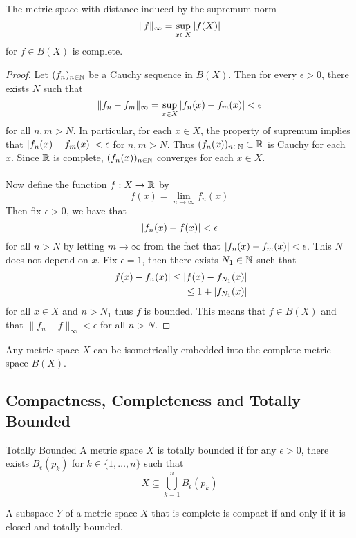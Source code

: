 \documentclass[a4paper]{article}
\begin{document}
\begin{prp}{}{} The metric space with distance induced by the supremum norm $$\|f\|_{\infty}=\sup_{x\in X}\abs{f(X)}$$ for $f\in B(X)$ is complete. \tcbline
\begin{proof}
Let $(f_n)_{n\in\mathbb{N}}$ be a Cauchy sequence in $B(X)$. Then for every $\epsilon>0$, there exists $N$ such that $$\|f_n-f_m\|_{\infty}=\sup_{x\in X}\abs{f_n(x)-f_m(x)}<\epsilon$$ for all $n,m>N$. In particular, for each $x\in X$, the property of supremum implies that $\abs{f_n(x)-f_m(x)}<\epsilon$ for $n,m>N$. Thus $(f_n(x))_{n\in\mathbb{N}}\subset\mathbb{R}$ is Cauchy for each $x$. Since $\mathbb{R}$ is complete, $(f_n(x))_{n\in\mathbb{N}}$ converges for each $x\in X$. \\~\\
Now define the function $f:X\to\mathbb{R}$ by $$f(x)=\lim_{n\to\infty}f_n(x)$$ Then fix $\epsilon>0$, we have that $$\abs{f_n(x)-f(x)}<\epsilon$$ for all $n>N$ by letting $m\to\infty$ from the fact that $\abs{f_n(x)-f_m(x)}<\epsilon$. This $N$ does not depend on $x$. Fix $\epsilon=1$, then there exists $N_1\in\mathbb{N}$ such that 
\begin{align*}
\abs{f(x)-f_n(x)}\leq\abs{f(x)-f_{N_1}(x)}\\
\leq 1+\abs{f_{N_1}(x)}
\end{align*} for all $x\in X$ and $n>N_1$ thus $f$ is bounded. This means that $f\in B(X)$ and that $\|f_n-f\|_\infty<\epsilon$ for all $n>N$. 
\end{proof}
\end{prp}

\begin{prp}{}{} Any metric space $X$ can be isometrically embedded into the complete metric space $B(X)$. 
\end{prp}

\subsection{Compactness, Completeness and Totally Bounded}
\begin{defn}{Totally Bounded}{} A metric space $X$ is totally bounded if for any $\epsilon>0$, there exists $B_\epsilon(p_k)$ for $k\in\{1,\dots,n\}$ such that $$X\subseteq\bigcup_{k=1}^nB_\epsilon(p_k)$$
\end{defn}

\begin{thm}{}{} A subspace $Y$ of a metric space $X$ that is complete is compact if and only if it is closed and totally bounded. 
\end{thm}
\end{document}
